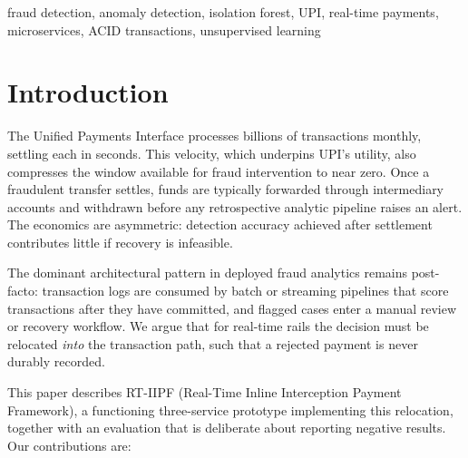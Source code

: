 \documentclass[journal]{IEEEtran}
\begin{document}
\begin{IEEEkeywords}
fraud detection, anomaly detection, isolation forest, UPI, real-time
payments, microservices, ACID transactions, unsupervised learning
\end{IEEEkeywords}

\section{Introduction}

The Unified Payments Interface processes billions of transactions monthly,
settling each in seconds. This velocity, which underpins UPI's utility, also
compresses the window available for fraud intervention to near zero. Once a
fraudulent transfer settles, funds are typically forwarded through
intermediary accounts and withdrawn before any retrospective analytic
pipeline raises an alert. The economics are asymmetric: detection accuracy
achieved after settlement contributes little if recovery is infeasible.

The dominant architectural pattern in deployed fraud analytics remains
post-facto: transaction logs are consumed by batch or streaming pipelines
that score transactions after they have committed, and flagged cases enter a
manual review or recovery workflow. We argue that for real-time rails the
decision must be relocated \emph{into} the transaction path, such that a
rejected payment is never durably recorded.

This paper describes RT-IIPF (Real-Time Inline Interception Payment
Framework), a functioning three-service prototype implementing this
relocation, together with an evaluation that is deliberate about reporting
negative results. Our contributions are:
\end{document}
